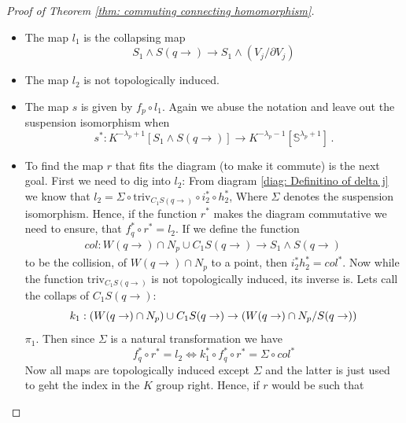 \begin{proof}[Proof of Theorem \ref{thm: commuting connecting homomorphism}]
\begin{itemize}
			\begin{align*}
				W(q\to)\cap N_q\Big/ S(q\to)& \to S^{\lambda_p+1}\\
				x& \mapsto \Gamma\circ  B_{\mathfrak{b}^q}^{-1}\circ {E^u_q}^{-1}(x)\,.
			\end{align*} Here $\Gamma$ maps the disk modulo its boundary to the sphere. 
			Hence $f_q=\left(B_{\mathfrak{b}^q}^{-1} \circ {E^u_q}^{-1}\right)^*:K^{}$
			\item The map $l_1$ is the collapsing map 
			\begin{equation*}
				S_1\wedge S(q\to)\to S_1 \wedge (V_j\big/ \partial V_j)
			\end{equation*}
			\item The map $l_2$ is not topologically induced. 
			\item The map $s$ is given by $f_p\circ l_1$. Again we abuse the notation and leave out the suspension isomorphism when 
			\begin{equation*}
				s^*: K^{-\lambda_p+1}[S_1\wedge S(q\to)]\to K^{-\lambda_p-1}[\mathbb{S}^{\lambda_p+1}]\,.
			\end{equation*}
			\item To find the map $r$ that fits the diagram (to make it commute) is the next goal. First we need to dig into $l_2$: From diagram \ref{diag: Definitino of delta j} we know that $l_2=\Sigma \circ \text{triv}_{C_1S(q\to)}\circ i_2^*\circ h_2^*$, Where $\Sigma$ denotes the suspension isomorphism. Hence, if the function $r^*$ makes the diagram commutative we need to ensure, that $f_q^* \circ r^*=l_2$. If we define the function 
			\begin{align*}
				col: W(q\to) \cap N_p \cup C_1  S(q\to) \to S_1 \wedge S(q\to) \,
			\end{align*} 
			to be the collision, of $W(q\to) \cap N_p $ to a point, then
			$i_2^*h_2^*=col^*$. Now while the function  $\text{triv}_{C_1S(q\to)}$ is not topologically induced, its inverse is. Lets call the collaps of $C_1S(q\to)$: 
			\begin{equation*}
				k_1:	\left(W(q\to)\cap N_p \right)\cup C_1S(q\to)\to \left(W(q\to)\cap N_p \middle/ S(q\to) \right) 
			\end{equation*}
			$\pi_1$. Then since $\Sigma$ is a natural transformation we have 
			\begin{equation*}
				f_q^*\circ r^*=l_2\Leftrightarrow k_1^*\circ f_q^*\circ r^*=\Sigma \circ col^*
			\end{equation*}
			Now all maps are topologically induced except $\Sigma$ and the latter is just used to geht the index in the $K$ group right. Hence, if $r$ would be such that

\end{itemize}
\end{proof}
